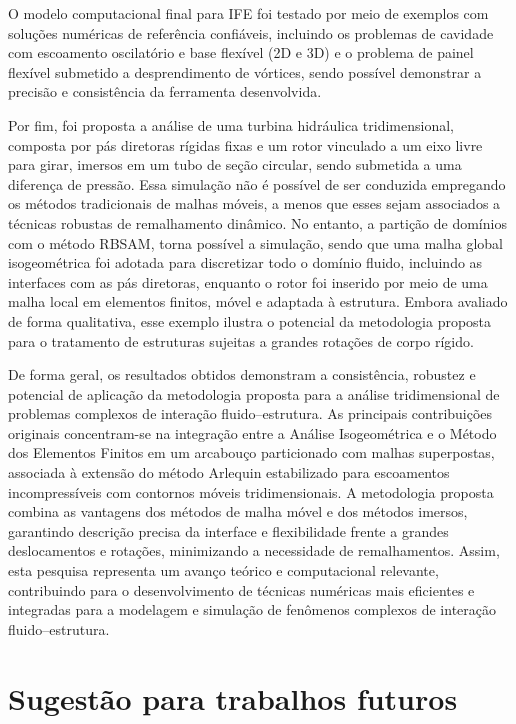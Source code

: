 O modelo computacional final para IFE foi testado por meio de exemplos com soluções numéricas de referência confiáveis, incluindo os problemas de cavidade com escoamento oscilatório e base flexível (2D e 3D) e o problema de painel flexível submetido a desprendimento de vórtices, sendo possível demonstrar a precisão e consistência da ferramenta desenvolvida. 

Por fim, foi proposta a análise de uma turbina hidráulica tridimensional, composta por pás diretoras rígidas fixas e um rotor vinculado a um eixo livre para girar, imersos em um tubo de seção circular, sendo submetida a uma diferença de pressão. Essa simulação não é possível de ser conduzida empregando os métodos tradicionais de malhas móveis, a menos que esses sejam associados a técnicas robustas de remalhamento dinâmico. No entanto, a partição de domínios com o método RBSAM, torna possível a simulação, sendo que uma malha global isogeométrica foi adotada para discretizar todo o domínio fluido, incluindo as interfaces com as pás diretoras, enquanto o rotor foi inserido por meio de uma malha local em elementos finitos, móvel e adaptada à estrutura. Embora avaliado de forma qualitativa, esse exemplo ilustra o potencial da metodologia proposta para o tratamento de estruturas sujeitas a grandes rotações de corpo rígido. 

De forma geral, os resultados obtidos demonstram a consistência, robustez e potencial de aplicação da metodologia proposta para a análise tridimensional de problemas complexos de interação fluido–estrutura. As principais contribuições originais concentram-se na integração entre a Análise Isogeométrica e o Método dos Elementos Finitos em um arcabouço particionado com malhas superpostas, associada à extensão do método Arlequin estabilizado para escoamentos incompressíveis com contornos móveis tridimensionais.
A metodologia proposta combina as vantagens dos métodos de malha móvel e dos métodos imersos, garantindo descrição precisa da interface e flexibilidade frente a grandes deslocamentos e rotações, minimizando a necessidade de remalhamentos.
Assim, esta pesquisa representa um avanço teórico e computacional relevante, contribuindo para o desenvolvimento de técnicas numéricas mais eficientes e integradas para a modelagem e simulação de fenômenos complexos de interação fluido–estrutura.

\section{Sugestão para trabalhos futuros}

